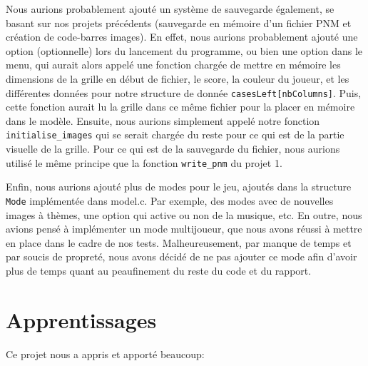 \documentclass[a4paper, 11pt, oneside]{article}
\begin{document}
Nous aurions probablement ajouté un système de sauvegarde également, se basant sur nos projets précédents (sauvegarde en mémoire d'un fichier PNM et création de code-barres images). En effet, nous aurions probablement ajouté une option (optionnelle) lors du lancement du programme, ou bien une option dans le menu, qui aurait alors appelé une fonction chargée de mettre en mémoire les dimensions de la grille en début de fichier, le score, la couleur du joueur, et les différentes données pour notre structure de donnée \texttt{casesLeft[nbColumns]}. Puis, cette fonction aurait lu la grille dans ce même fichier pour la placer en mémoire dans le modèle. Ensuite, nous aurions simplement appelé notre fonction \texttt{initialise\_images} qui se serait chargée du reste pour ce qui est de la partie visuelle de la grille.
Pour ce qui est de la sauvegarde du fichier, nous aurions utilisé le même principe que la fonction \texttt{write\_pnm} du projet 1.

Enfin, nous aurions ajouté plus de modes pour le jeu, ajoutés dans la structure \texttt{Mode} implémentée dans model.c. Par exemple, des modes avec  de nouvelles images à thèmes, une option qui active ou non de la musique, etc. En outre, nous avions pensé à implémenter un mode multijoueur, que nous avons réussi à mettre en place dans le cadre de nos tests. Malheureusement, par manque de temps et par soucis de propreté, nous avons décidé de ne pas ajouter ce mode afin d'avoir plus de temps quant au peaufinement du reste du code et du rapport.

\section{Apprentissages}

Ce projet nous a appris et apporté beaucoup:
\end{document}
